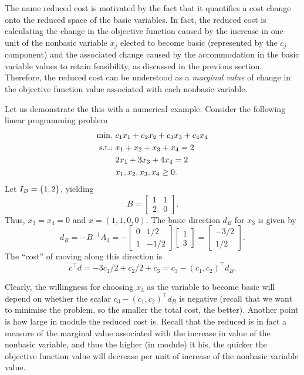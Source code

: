 The name reduced cost is motivated by the fact that it quantifies a cost change onto the reduced space of the basic variables. In fact, the reduced cost is calculating the change in the objective function caused by the increase in one unit of the nonbasic variable $x_j$ elected to become basic (represented by the $c_j$ component) and the associated change caused by the accommodation in the basic variable values to retain feasibility, as discussed in the previous section. Therefore, the reduced cost can be understood as a \emph{marginal value} of change in the objective function value associated with each nonbasic variable.

Let us demonstrate the this with a numerical example. Consider the following linear programming problem
%
\begin{align*}
	\mathop{\text{min.~}} & c_1x_1 + c_2x_2 + c_3x_3 + c_4x_4 \\	
	\mathop{\text{s.t.:~}} & x_1 + x_2 + x_3 + x_4 = 2 \\
	& 2x_1 + 3x_3 + 4x_4 = 2 \\
	& x_1, x_2 ,x_3, x_4 \geq 0.  
\end{align*}  
%
Let $I_B = \left\{ 1,2 \right \}$, yielding
% 
\begin{equation*}
	B = \begin{bmatrix}
    		1 & 1 \\
    		2 & 0
    	\end{bmatrix}.
\end{equation*} 
%
Thus, $x_3= x_4 =0$ and $x = (1,1,0,0)$. The basic direction $d_B$ for $x_3$ is given by
%
\begin{equation*}
    d_B = -B^{-1}A_3 = -\begin{bmatrix}
    	0 & 1/2 \\
    	1 & -1/2
    \end{bmatrix} \begin{bmatrix}
    	1 \\ 3
    \end{bmatrix} = \begin{bmatrix}
    	-3/2 \\ 1/2
    \end{bmatrix}.
\end{equation*}
%
The ``cost'' of moving along this direction is 
%
\begin{equation*}
	c^\top d = -3c_1/2 + c_2/2 +c_3 = c_3 - (c_1, c_2)^\top d_B.
\end{equation*}

Clearly, the willingness for choosing $x_3$ as the variable to become basic will depend on whether the scalar $c_3 - (c_1, c_2)^\top d_B$ is negative (recall that we want to minimise the problem, so the smaller the total cost, the better). Another point is how large in module the reduced cost is. Recall that the reduced is in fact a measure of the marginal value associated with the increase in value of the nonbasic variable, and thus the higher (in module) it his, the quicker the objective function value will decrease per unit of increase of the nonbasic variable value.

